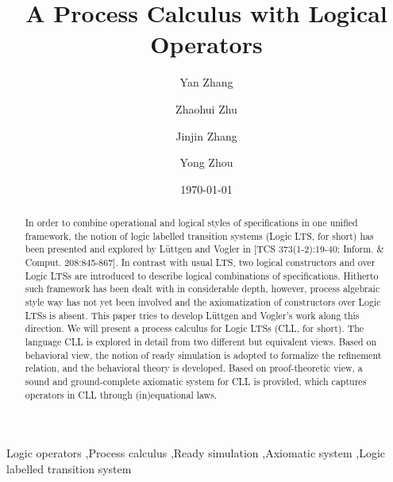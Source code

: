 \documentclass{elsarticle}
\theoremstyle{plain}
\theoremstyle{definition}
\begin{document}
\author[nuaa]{Yan Zhang}

\author[nuaa]{Zhaohui Zhu}

\author[nanshen]{Jinjin Zhang}

\author[nuaa]{Yong Zhou}


\address[nuaa]{College of Computer Science, Nanjing University of Aeronautics and Astronautics, Nanjing, P.R. China, 210016}
\address[nanshen]{College of Information Science, Nanjing Audit University, \\Nanjing, P.R. China, 211815}


\title{A Process Calculus with Logical Operators}
\date{\today}
\begin{abstract}

In order to combine operational and logical styles of specifications in one unified framework, the notion of logic labelled transition systems (Logic LTS, for short) has been presented and explored by L\"{u}ttgen and Vogler in [TCS 373(1-2):19-40; Inform. \& Comput. 208:845-867].
In contrast with usual LTS, two logical constructors  and  over Logic LTSs are introduced to describe logical combinations of specifications.
Hitherto such framework has been dealt with in considerable depth, however, process algebraic style way has not yet been involved and the axiomatization of constructors over Logic LTSs is absent.
This paper tries to develop L\"{u}ttgen and Vogler's work along this direction.
We will present a process calculus for Logic LTSs (CLL, for short).
The language CLL is explored in detail from two different but equivalent views.
Based on behavioral view, the notion of ready simulation is adopted to formalize the refinement relation, and the behavioral theory is developed.
Based on proof-theoretic view, a sound and ground-complete axiomatic system for CLL is provided, which captures operators in CLL through (in)equational laws.
\end{abstract}

\begin{keyword}
  Logic operators \sep Process calculus \sep Ready simulation \sep Axiomatic system \sep Logic labelled transition system
\end{keyword}


\maketitle
\end{document}
